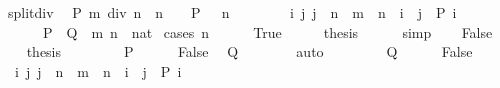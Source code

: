 \begin{isabellebody}
\ split{\isacharunderscore}{\kern0pt}div{\isacharcolon}{\kern0pt}\isanewline
\ \ {\isachardoublequoteopen}P\ {\isacharparenleft}{\kern0pt}m\ div\ n{\isacharparenright}{\kern0pt}\ {\isasymlongleftrightarrow}\ {\isacharparenleft}{\kern0pt}n\ {\isacharequal}{\kern0pt}\ {}\ {\isasymlongrightarrow}\ P\ {}{\isacharparenright}{\kern0pt}\ {\isasymand}\ {\isacharparenleft}{\kern0pt}n\ {\isasymnoteq}\ {}\ {\isasymlongrightarrow}\isanewline
\ \ \ \ \ {\isacharparenleft}{\kern0pt}{\isasymforall}i\ j{\isachardot}{\kern0pt}\ j\ {\isacharless}{\kern0pt}\ n\ {\isasymlongrightarrow}\ m\ {\isacharequal}{\kern0pt}\ n\ {\isacharasterisk}{\kern0pt}\ i\ {\isacharplus}{\kern0pt}\ j\ {\isasymlongrightarrow}\ P\ i{\isacharparenright}{\kern0pt}{\isacharparenright}{\kern0pt}{\isachardoublequoteclose}\isanewline
\ \ \ \ \ {\isacharparenleft}{\kern0pt}\ {\isachardoublequoteopen}{\isacharquery}{\kern0pt}P\ {\isacharequal}{\kern0pt}\ {\isacharquery}{\kern0pt}Q{\isachardoublequoteclose}{\isacharparenright}{\kern0pt}\ \ m\ n\ {\isacharcolon}{\kern0pt}{\isacharcolon}{\kern0pt}\ nat\isanewline
%
\isadelimproof
%
\endisadelimproof
%
\isatagproof
{}\isamarkupfalse%
\ {\isacharparenleft}{\kern0pt}cases\ {\isachardoublequoteopen}n\ {\isacharequal}{\kern0pt}\ {}{\isachardoublequoteclose}{\isacharparenright}{\kern0pt}\isanewline
\ \ \isamarkupfalse%
\ True\isanewline
\ \ \isamarkupfalse%
\ \isamarkupfalse%
\ {\isacharquery}{\kern0pt}thesis\isanewline
\ \ \ \ \isamarkupfalse%
\ simp\isanewline
{}\isamarkupfalse%
\isanewline
\ \ \isamarkupfalse%
\ False\isanewline
\ \ \isamarkupfalse%
\ {\isacharquery}{\kern0pt}thesis\isanewline
\ \ \isamarkupfalse%
\isanewline
\ \ \ \ \isamarkupfalse%
\ {\isacharquery}{\kern0pt}P\isanewline
\ \ \ \ \isamarkupfalse%
\ False\ \isamarkupfalse%
\ {\isacharquery}{\kern0pt}Q\isanewline
\ \ \ \ \ \ \isamarkupfalse%
\ auto\isanewline
\ \ \isamarkupfalse%
\isanewline
\ \ \ \ \isamarkupfalse%
\ {\isacharquery}{\kern0pt}Q\isanewline
\ \ \ \ \isamarkupfalse%
\ False\ \isamarkupfalse%
\ {\isacharasterisk}{\kern0pt}{\isacharcolon}{\kern0pt}\ {\isachardoublequoteopen}{\isasymAnd}i\ j{\isachardot}{\kern0pt}\ j\ {\isacharless}{\kern0pt}\ n\ {\isasymLongrightarrow}\ m\ {\isacharequal}{\kern0pt}\ n\ {\isacharasterisk}{\kern0pt}\ i\ {\isacharplus}{\kern0pt}\ j\ {\isasymLongrightarrow}\ P\ i{\isachardoublequoteclose}\isanewline

\end{isabellebody}

